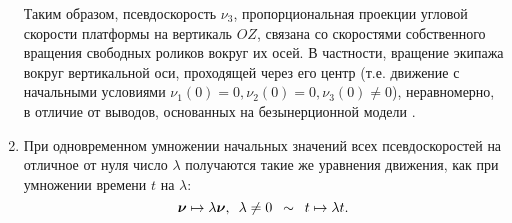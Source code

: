 \begin{enumerate}[wide]
    Таким образом, псевдоскорость $\nu_3$, пропорциональная проекции угловой скорости платформы на вертикаль $OZ$, связана со скоростями собственного вращения свободных роликов вокруг их осей. В частности, вращение экипажа вокруг вертикальной оси, проходящей через его центр (т.е. движение с начальными условиями $\nu_1(0) = 0, \nu_2(0) = 0, \nu_3(0) \neq 0$), неравномерно, в отличие от выводов, основанных на безынерционной модели \cite{ZobovaTatarinovPMM}.
    \item При одновременном умножении начальных значений всех псевдоскоростей на отличное от нуля число $\lambda$ получаются такие же уравнения движения, как при умножении времени $t$ на $\lambda$:
    $$
        \boldsymbol{\mathbf{\nu}} \mapsto \lambda\boldsymbol{\mathbf{\nu}}, \enspace \lambda \neq 0 \enspace \sim \enspace t \mapsto \lambda t.
    $$
\end{enumerate}

